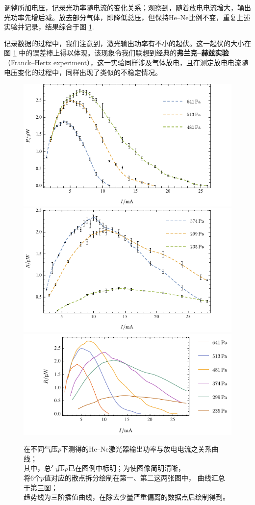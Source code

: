 \documentclass[aps,pre,12pt,preprint,%
	onecolumn,showpacs,showkeys,nofootinbib]{revtex4-1}
\begin{document}
	调整所加电压，记录光功率随电流的变化关系；观察到，随着放电电流增大，输出光功率先增后减。放去部分气体，即降低总压，但保持He--Ne比例不变，重复上述实验并记录，结果综合于图 \ref{fig:powerVamp}. 
	
	记录数据的过程中，我们注意到，激光输出功率有不小的起伏。这一起伏的大小在图 \ref{fig:powerVamp} 中的误差棒上得以体现。该现象令我们联想到经典的\textbf{弗兰克--赫兹实验}（Franck–Hertz experiment），这一实验同样涉及气体放电，且在测定放电电流随电压变化的过程中，同样出现了类似的不稳定情况。
	
	\begin{figure}[!h]
	\centering
	\includegraphics[height=.36\linewidth]{plotPowerAmp1.pdf}\\[1.5ex]
	\includegraphics[height=.36\linewidth]{plotPowerAmp2.pdf}\\[1.5ex]
	\hspace{0em}
	\includegraphics[height=.42\linewidth]{plotPowerAmpAll.pdf}
	\caption[输出功率变化曲线]{在不同气压$p$下测得的\textup{He--Ne}激光器输出功率与放电电流之关系曲线；\\[.8ex]
		其中，总气压$p$已在图例中标明；为使图像简明清晰，\\
		将6个$p$值对应的散点拆分绘制在第一、第二这两张图中，
		曲线汇总于第三图；\\
		趋势线为三阶插值曲线，在除去少量严重偏离的数据点后绘制得到。}
	\label{fig:powerVamp}
	\end{figure}
\FloatBarrier
	
\end{document}
